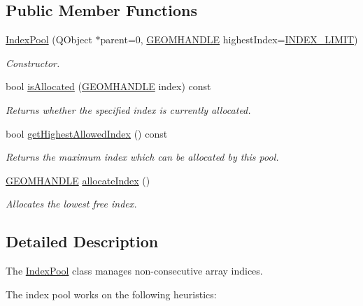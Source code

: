 \subsection*{Public Member Functions}
\begin{DoxyCompactItemize}
\item 
\hyperlink{class_index_pool_a26e3c07764def73d6ebf8a1df0ce9bb4}{Index\-Pool} (Q\-Object $\ast$parent=0, \hyperlink{vertex_8h_a72202e57358ed73cd212e9a2eaf39aeb}{G\-E\-O\-M\-H\-A\-N\-D\-L\-E} highest\-Index=\hyperlink{class_index_pool_abacc88fb0ea6d1dcad5be70710ed0e3da3a3d6446453050cd4c95439b37b6824a}{I\-N\-D\-E\-X\-\_\-\-L\-I\-M\-I\-T})
\begin{DoxyCompactList}\small\item\em Constructor. \end{DoxyCompactList}\item 
bool \hyperlink{class_index_pool_a6001551942dde955048c7fdca82cbda7}{is\-Allocated} (\hyperlink{vertex_8h_a72202e57358ed73cd212e9a2eaf39aeb}{G\-E\-O\-M\-H\-A\-N\-D\-L\-E} index) const 
\begin{DoxyCompactList}\small\item\em Returns whether the specified index is currently allocated. \end{DoxyCompactList}\item 
bool \hyperlink{class_index_pool_a6f3dade75f8853215eb40b8dc9593f6c}{get\-Highest\-Allowed\-Index} () const 
\begin{DoxyCompactList}\small\item\em Returns the maximum index which can be allocated by this pool. \end{DoxyCompactList}\item 
\hyperlink{vertex_8h_a72202e57358ed73cd212e9a2eaf39aeb}{G\-E\-O\-M\-H\-A\-N\-D\-L\-E} \hyperlink{class_index_pool_a47301791c0015a14e7f459ae3efb614c}{allocate\-Index} ()
\begin{DoxyCompactList}\small\item\em Allocates the lowest free index. \end{DoxyCompactList}\end{DoxyCompactItemize}


\subsection{Detailed Description}
The \hyperlink{class_index_pool}{Index\-Pool} class manages non-\/consecutive array indices. 

The index pool works on the following heuristics\-:\par
 
